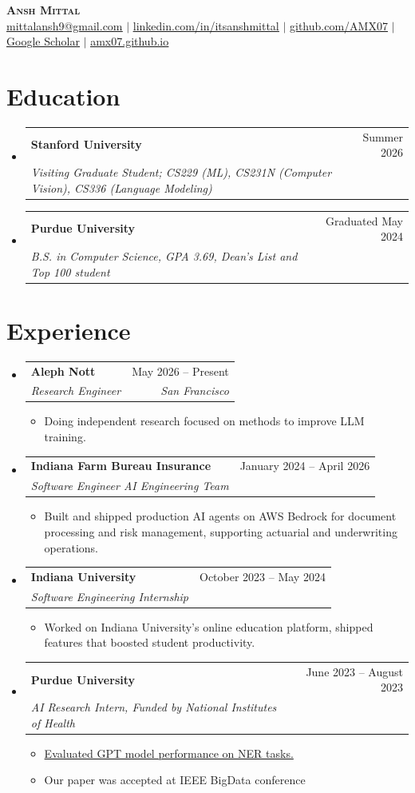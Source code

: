 \documentclass[letterpaper,11pt]{article}
\makeatletter
\newcommand{\resumeItem}[1]{\item\small{{#1 \vspace{-2pt}}}}
\newcommand{\resumeSubheading}[4]{\vspace{-2pt}\item\begin{tabular*}{0.97\textwidth}[t]{l@{\extracolsep{\fill}}r}\textbf{#1} & #2 \\ \textit{\small#3} & \textit{\small #4} \\ \end{tabular*}\vspace{-7pt}}
\newcommand{\resumeSubHeadingListStart}{\begin{itemize}[leftmargin=0.15in, label={}]}
\newcommand{\resumeSubHeadingListEnd}{\end{itemize}}
\newcommand{\resumeItemListStart}{\begin{itemize}}
\newcommand{\resumeItemListEnd}{\end{itemize}\vspace{-5pt}}
\makeatother
\begin{document}
\begin{center}
  \textbf{\Huge \scshape Ansh Mittal} \\ \vspace{1pt}
  \small
  \href{mailto:mittalansh9@gmail.com}{\underline{mittalansh9@gmail.com}} $|$
  \href{https://linkedin.com/in/itsanshmittal}{\underline{linkedin.com/in/itsanshmittal}} $|$
  \href{https://github.com/AMX07}{\underline{github.com/AMX07}} $|$
  \href{https://scholar.google.com/citations?user=qBmz69AAAAAJ&hl=en}{\underline{Google Scholar}} $|$
  \href{https://amx07.github.io}{\underline{amx07.github.io}}
\end{center}
\section{Education}
\resumeSubHeadingListStart
  \resumeSubheading{Stanford University}{Summer 2026}{Visiting Graduate Student; CS229 (ML), CS231N (Computer Vision), CS336 (Language Modeling)}{ }
  \resumeSubheading{Purdue University}{Graduated May 2024}{B.S. in Computer Science, GPA 3.69, Dean's List and Top 100 student}{ }
\resumeSubHeadingListEnd
\section{Experience}
\resumeSubHeadingListStart
  \resumeSubheading{Aleph Nott}{May 2026 -- Present}{Research Engineer}{San Francisco}
  \resumeItemListStart
    \resumeItem{Doing independent research focused on methods to improve LLM training.}
  \resumeItemListEnd
  \resumeSubheading{Indiana Farm Bureau Insurance}{January 2024 -- April 2026}{Software Engineer \textbar{} AI Engineering Team}{}
  \resumeItemListStart
    \resumeItem{Built and shipped production AI agents on AWS Bedrock for document processing and risk management, supporting actuarial and underwriting operations.}
  \resumeItemListEnd
  \resumeSubheading{Indiana University}{October 2023 -- May 2024}{Software Engineering Internship}{}
  \resumeItemListStart
    \resumeItem{Worked on Indiana University's online education platform, shipped features that boosted student productivity.}
  \resumeItemListEnd
  \resumeSubheading{Purdue University}{June 2023 -- August 2023}{AI Research Intern, Funded by National Institutes of Health}{}
  \resumeItemListStart
    \resumeItem{\href{https://arxiv.org/abs/2309.05475}{Evaluated GPT model performance on NER tasks.}}
    \resumeItem{Our paper was accepted at IEEE BigData conference}
  \resumeItemListEnd
\resumeSubHeadingListEnd
\end{document}
